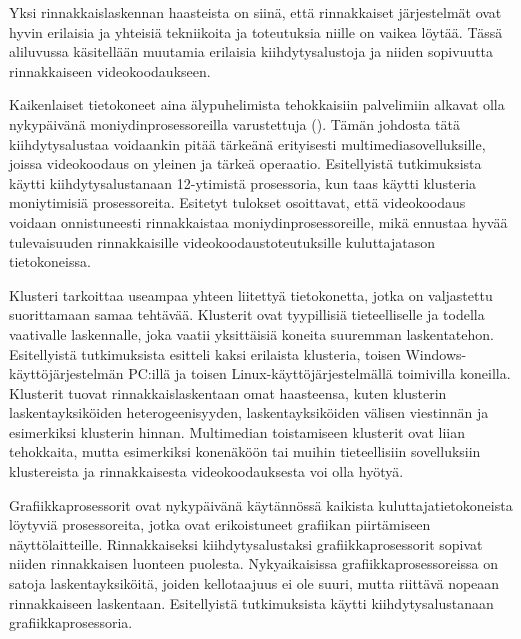 Yksi rinnakkaislaskennan haasteista on siinä, että rinnakkaiset järjestelmät
ovat hyvin erilaisia ja yhteisiä tekniikoita ja toteutuksia niille on vaikea
löytää. Tässä aliluvussa käsitellään muutamia erilaisia kiihdytysalustoja ja
niiden sopivuutta rinnakkaiseen videokoodaukseen.


Kaikenlaiset tietokoneet aina älypuhelimista tehokkaisiin palvelimiin alkavat
olla nykypäivänä moniydinprosessoreilla varustettuja (\citealt{choi}). Tämän
johdosta tätä kiihdytysalustaa voidaankin pitää tärkeänä erityisesti
multimediasovelluksille, joissa videokoodaus on yleinen ja tärkeä operaatio.
Esitellyistä tutkimuksista \citealt{chi} käytti kiihdytysalustanaan 12-ytimistä
prosessoria, kun taas \citealt{li} käytti klusteria moniytimisiä prosessoreita.
Esitetyt tulokset osoittavat, että videokoodaus voidaan onnistuneesti
rinnakkaistaa moniydinprosessoreille, mikä ennustaa hyvää tulevaisuuden
rinnakkaisille videokoodaustoteutuksille kuluttajatason tietokoneissa.


Klusteri tarkoittaa useampaa yhteen liitettyä tietokonetta, jotka on valjastettu
suorittamaan samaa tehtävää. Klusterit ovat tyypillisiä tieteelliselle ja
todella vaativalle laskennalle, joka vaatii yksittäisiä koneita suuremman 
laskentatehon. Esitellyistä tutkimuksista \citealt{li} esitteli kaksi erilaista
klusteria, toisen Windows-käyttöjärjestelmän PC:illä ja toisen
Linux-käyttöjärjestelmällä toimivilla koneilla. Klusterit tuovat 
rinnakkaislaskentaan omat haasteensa, kuten klusterin laskentayksiköiden
heterogeenisyyden, laskentayksiköiden välisen viestinnän ja esimerkiksi
klusterin hinnan. Multimedian toistamiseen klusterit ovat liian tehokkaita,
mutta esimerkiksi konenäköön tai muihin tieteellisiin sovelluksiin klustereista
ja rinnakkaisesta videokoodauksesta voi olla hyötyä.


Grafiikkaprosessorit ovat nykypäivänä käytännössä kaikista
kuluttajatietokoneista löytyviä prosessoreita, jotka ovat erikoistuneet
grafiikan piirtämiseen näyttölaitteille. Rinnakkaiseksi kiihdytysalustaksi
grafiikkaprosessorit sopivat niiden rinnakkaisen luonteen puolesta.
Nykyaikaisissa grafiikkaprosessoreissa on satoja laskentayksiköitä, joiden
kellotaajuus ei ole suuri, mutta riittävä nopeaan rinnakkaiseen laskentaan.
Esitellyistä tutkimuksista \citealt{pieters} käytti kiihdytysalustanaan
grafiikkaprosessoria.

